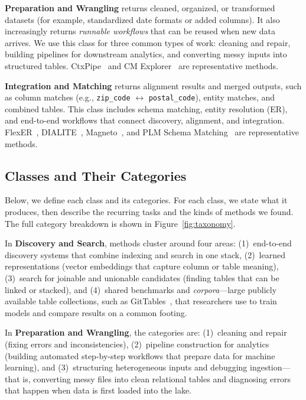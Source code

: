 \documentclass[sigconf,nonacm]{acmart}
\begin{document}
\textbf{Preparation and Wrangling} returns cleaned, organized, or transformed datasets (for example, standardized date formats or added columns). It also increasingly returns \emph{runnable workflows} that can be reused when new data arrives. We use this class for three common types of work: cleaning and repair, building pipelines for downstream analytics, and converting messy inputs into structured tables. CtxPipe~\cite{10.1145/3698831} and CM Explorer~\cite{10.14778/3611540.3611595} are representative methods.

\textbf{Integration and Matching} returns alignment results and merged outputs, such as column matches (e.g., \texttt{zip\_code} $\leftrightarrow$ \texttt{postal\_code}), entity matches, and combined tables. This class includes schema matching, entity resolution (ER), and end-to-end workflows that connect discovery, alignment, and integration. FlexER~\cite{10.1145/3588722}, DIALITE~\cite{10.1145/3555041.3589732}, Magneto~\cite{10.14778/3742728.3742757}, and PLM Schema Matching~\cite{10184612} are representative methods.


\subsection{Classes and Their Categories}
\label{sec:taxonomy-classes}
Below, we define each class and its categories. For each class, we state what it produces, then describe the recurring tasks and the kinds of methods we found. The full category breakdown is shown in Figure~\ref{fig:taxonomy}.

In \textbf{Discovery and Search}, methods cluster around four areas: (1)~end-to-end discovery systems that combine indexing and search in one stack, (2)~learned representations (vector embeddings that capture column or table meaning), (3)~search for joinable and unionable candidates (finding tables that can be linked or stacked), and (4)~shared benchmarks and \emph{corpora}---large publicly available table collections, such as GitTables~\cite{10.1145/3588710}, that researchers use to train models and compare results on a common footing.

In \textbf{Preparation and Wrangling}, the categories are: (1)~cleaning and repair (fixing errors and inconsistencies), (2)~pipeline construction for analytics (building automated step-by-step workflows that prepare data for machine learning), and (3)~structuring heterogeneous inputs and debugging ingestion---that is, converting messy files into clean relational tables and diagnosing errors that happen when data is first loaded into the lake.
\end{document}
